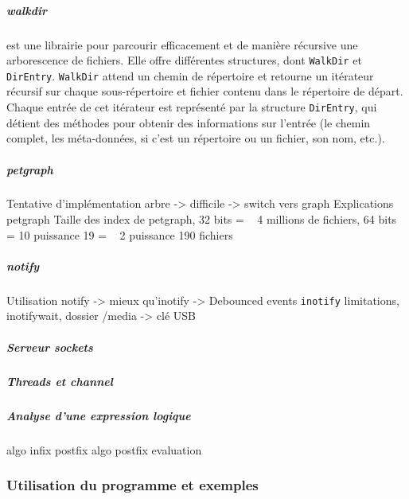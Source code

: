 
\subparagraph{walkdir}
est une librairie pour parcourir efficacement et de manière récursive une arborescence de fichiers.
Elle offre différentes structures, dont \texttt{WalkDir} et \texttt{DirEntry}. 
\texttt{WalkDir} attend un chemin de répertoire et retourne un itérateur récursif sur 
chaque sous-répertoire et fichier contenu dans le répertoire de départ. Chaque entrée de cet 
itérateur est représenté par la structure \texttt{DirEntry}, qui détient des méthodes 
pour obtenir des informations sur l'entrée (le chemin complet, les méta-données, si c'est un 
répertoire ou un fichier, son nom, etc.).

\subparagraph{petgraph}
Tentative d'implémentation arbre -> difficile -> switch vers graph
\cite{ref26}
Explications petgraph
Taille des index de petgraph, 32 bits = ~ 4 millions de fichiers, 64 bits = 10 puissance 19 = ~ 2 puissance 190 fichiers

\subparagraph{notify}
Utilisation notify -> mieux qu'inotify -> Debounced events
\texttt{inotify} limitations, inotifywait, dossier /media -> clé USB

\subparagraph{Serveur sockets}

\subparagraph{Threads et \textit{channel}}

\subparagraph{Analyse d'une expression logique}
algo infix postfix \cite{ref40}
algo postfix evaluation \cite{ref41}

\subsubsection{Utilisation du programme et exemples}
